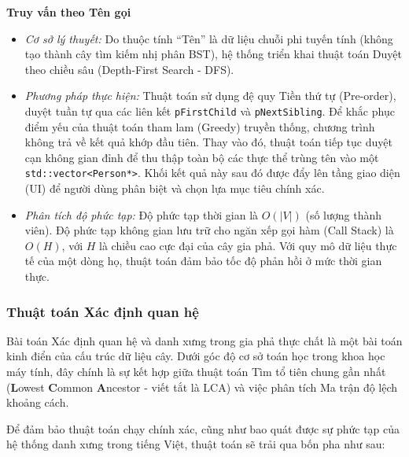 \textbf{Truy vấn theo Tên gọi}
	\begin{itemize}
		\item \textit{Cơ sở lý thuyết:} Do thuộc tính ``Tên'' là dữ liệu chuỗi phi tuyến tính (không tạo thành cây tìm kiếm nhị phân BST), hệ thống triển khai thuật toán Duyệt theo chiều sâu (Depth-First Search - DFS).
		\item \textit{Phương pháp thực hiện:} Thuật toán sử dụng đệ quy Tiền thứ tự (Pre-order), duyệt tuần tự qua các liên kết \texttt{pFirstChild} và \texttt{pNextSibling}. Để khắc phục điểm yếu của thuật toán tham lam (Greedy) truyền thống, chương trình không trả về kết quả khớp đầu tiên. Thay vào đó, thuật toán tiếp tục duyệt cạn không gian đỉnh để thu thập toàn bộ các thực thể trùng tên vào một \texttt{std::vector<Person*>}. Khối kết quả này sau đó được đẩy lên tầng giao diện (UI) để người dùng phân biệt và chọn lựa mục tiêu chính xác.
		\item \textit{Phân tích độ phức tạp:} Độ phức tạp thời gian là $O(|V|)$ (số lượng thành viên). Độ phức tạp không gian lưu trữ cho ngăn xếp gọi hàm (Call Stack) là $O(H)$, với $H$ là chiều cao cực đại của cây gia phả. Với quy mô dữ liệu thực tế của một dòng họ, thuật toán đảm bảo tốc độ phản hồi ở mức thời gian thực.
	\end{itemize}

\subsubsection{Thuật toán Xác định quan hệ}
\label{sssec:lca1}

Bài toán Xác định quan hệ và danh xưng trong gia phả thực chất là một bài toán kinh điển của cấu trúc dữ liệu cây. Dưới góc độ cơ sở toán học trong khoa học máy tính, đây chính là sự kết hợp giữa thuật toán Tìm tổ tiên chung gần nhất (\textbf{L}owest \textbf{C}ommon \textbf{A}ncestor - viết tắt là LCA) và việc phân tích Ma trận độ lệch khoảng cách.

Để đảm bảo thuật toán chạy chính xác, cũng như bao quát được sự phức tạp của hệ thống danh xưng trong tiếng Việt, thuật toán sẽ trải qua bốn pha như sau:

